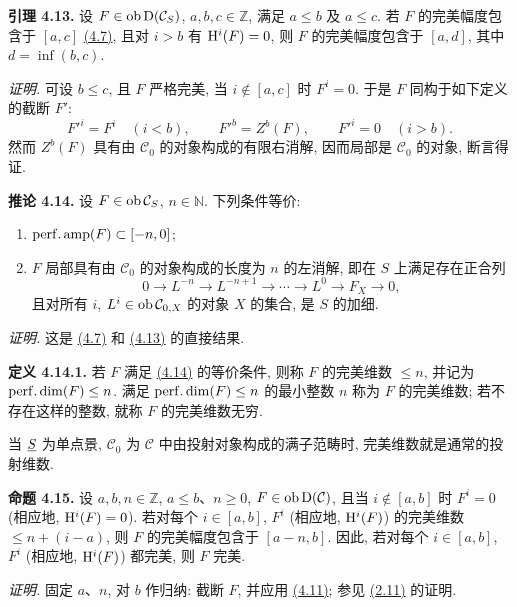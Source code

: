 \textbf{引理 4.13.} 设 \(F\in\operatorname{ob} \mathrm D(\mathcal C_S)\), \(a,b,c\in\mathbb Z\), 满足 \(a\leq b\) 及 \(a\leq c\). 若 \(F\) 的完美幅度包含于 \([a,c]\) \hyperlink{sga6.e01.def.4-7}{(4.7)}, 且对 \(i>b\) 有 \(\mathrm H^i(F)=0\), 则 \(F\) 的完美幅度包含于 \([a,d]\), 其中 \(d=\inf(b,c)\).

\emph{证明.} 可设 \(b\leq c\), 且 \(F\) 严格完美, 当 \(i\notin [a,c]\) 时 \(F^i=0\). 于是 \(F\) 同构于如下定义的截断 \(F'\):
\[
  F'^i=F^i\quad (i<b),\qquad F'^b=Z^b(F),\qquad F'^i=0\quad (i>b).
\]
然而 \(Z^b(F)\) 具有由 \(\mathcal C_0\) 的对象构成的有限右消解, 因而局部是 \(\mathcal C_0\) 的对象, 断言得证.

\textbf{推论 4.14.} 设 \(F\in\operatorname{ob}\mathcal C_S\), \(n\in\mathbb N\). 下列条件等价:
\begin{enumerate}[label=(\roman*)]
\item \(\operatorname{perf.amp}(F)\subset[-n,0]\);
\item \(F\) 局部具有由 \(\mathcal C_0\) 的对象构成的长度为 \(n\) 的左消解, 即在 \(S\) 上满足存在正合列
\[
  0\longrightarrow L^{-n}\longrightarrow L^{-n+1}\longrightarrow \cdots
  \longrightarrow L^0\longrightarrow F_X\longrightarrow 0,
\]
且对所有 \(i\), \(L^i\in\operatorname{ob}\mathcal C_{0,X}\) 的对象 \(X\) 的集合, 是 \(S\) 的加细.
\end{enumerate}

\emph{证明.} 这是 \hyperlink{sga6.e01.def.4-7}{(4.7)} 和 \hyperlink{sga6.e01.lem.4-13}{(4.13)} 的直接结果.

\textbf{定义 4.14.1.} 若 \(F\) 满足 \hyperlink{sga6.e01.cor.4-14}{(4.14)} 的等价条件, 则称 \(F\) 的完美维数 \(\leq n\), 并记为 \(\operatorname{perf.dim}(F)\leq n\). 满足 \(\operatorname{perf.dim}(F)\leq n\) 的最小整数 \(n\) 称为 \(F\) 的完美维数; 若不存在这样的整数, 就称 \(F\) 的完美维数无穷.

当 \(\underline S\) 为单点景, \(\mathcal C_0\) 为 \(\mathcal C\) 中由投射对象构成的满子范畴时, 完美维数就是通常的投射维数.

\textbf{命题 4.15.} 设 \(a,b,n\in\mathbb Z\), \(a\leq b\)、\(n\geq0\), \(F\in\operatorname{ob}\mathrm D(\mathcal C)\), 且当 \(i\notin[a,b]\) 时 \(F^i=0\) (相应地, \(\mathrm H^i(F)=0\)). 若对每个 \(i\in[a,b]\), \(F^i\) (相应地, \(\mathrm H^i(F)\)) 的完美维数 \(\leq n+(i-a)\), 则 \(F\) 的完美幅度包含于 \([a-n,b]\). 因此, 若对每个 \(i\in[a,b]\), \(F^i\) (相应地, \(\mathrm H^i(F)\)) 都完美, 则 \(F\) 完美.

\emph{证明.} 固定 \(a\)、\(n\), 对 \(b\) 作归纳: 截断 \(F\), 并应用 \hyperlink{sga6.e01.complement.4-11}{(4.11)}; 参见 \hyperlink{sga6.e01.prop.2-11}{(2.11)} 的证明.

